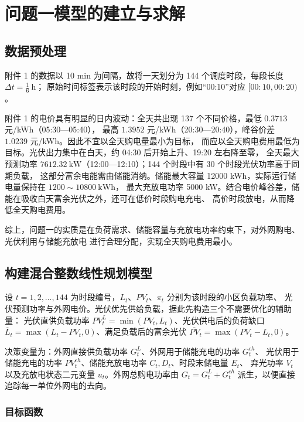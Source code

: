 \section{问题一模型的建立与求解}
\subsection{数据预处理}

附件 1 的数据以 10 min 为间隔，故将一天划分为 144 个调度时段，每段长度 \(\Delta t=\frac{1}{6}\ \mathrm{h}\)；
原始时间标签表示该时段的开始时刻，例如“00:10”对应 \([00:10,00:20)\)。

附件 1 的电价具有明显的日内波动：全天共出现 137 个不同价格，最低 \(0.3713\) 元/kWh（05:30—05:40），
最高 \(1.3952\) 元/kWh（20:30—20:40），峰谷价差 \(1.0239\) 元/kWh。因此不宜以全天购电量最小为目标，
而应以全天购电费用最低为目标。光伏出力集中在白天，约 04:30 后开始上升、19:20 左右降至零，
全天最大预测功率 \(7612.32\ \mathrm{kW}\)（12:00—12:10）；144 个时段中有 30 个时段光伏功率高于同期负载，
这部分富余电能需由储能消纳。储能最大容量 12000 kWh，实际运行储电量保持在 \(1200\sim10800\ \mathrm{kWh}\)，
最大充放电功率 5000 kW。结合电价峰谷差，储能在吸收白天富余光伏之外，还可在低价时段购电充电、
高价时段放电，从而降低全天购电费用。

综上，问题一的实质是在负荷需求、储能容量与充放电功率约束下，对外网购电、光伏利用与储能充放电
进行合理分配，实现全天购电费用最小。

\subsection{构建混合整数线性规划模型}

设 \(t=1,2,\ldots,144\) 为时段编号，\(L_t\)、\(PV_t\)、\(\pi_t\) 分别为该时段的小区负载功率、
光伏预测功率与外网电价。光伏优先供给负载，据此先构造三个不需要优化的辅助量：
光伏直供负载功率 \(PV_t^{L}=\min(PV_t,L_t)\)、光伏供电后的负荷缺口
\(\overline L_t=\max(L_t-PV_t,0)\)、满足负载后的富余光伏 \(\overline{PV}_t=\max(PV_t-L_t,0)\)。

决策变量为：外网直接供负载功率 \(G_t^L\)、外网用于储能充电的功率 \(G_t^{ch}\)、
光伏用于储能充电的功率 \(PV_t^{ch}\)、储能充放电功率 \(C_t,D_t\)、时段末储电量 \(E_t\)、
弃光功率 \(V_t\) 以及充放电状态二元变量 \(u_t\)。外网总购电功率由
\(G_t=G_t^L+G_t^{ch}\) 派生，以便直接追踪每一单位外网电的去向。

\subsubsection{目标函数}

